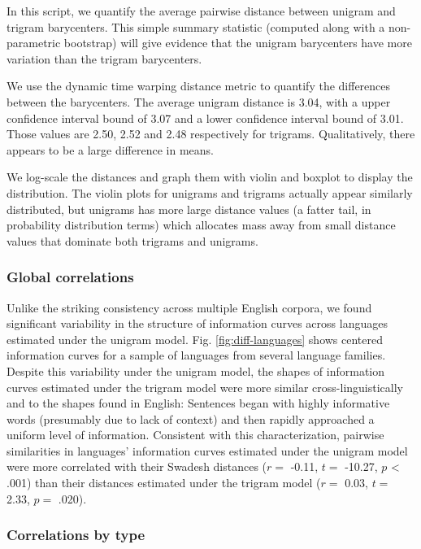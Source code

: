 \documentclass[man,floatsintext]{apa6}
\begin{document}
In this script, we quantify the average pairwise distance between unigram and trigram barycenters. This simple summary statistic (computed along with a non-parametric bootstrap) will give evidence that the unigram barycenters have more variation than the trigram barycenters.

We use the dynamic time warping distance metric to quantify the differences between the barycenters. The average unigram distance is 3.04, with a upper confidence interval bound of 3.07 and a lower confidence interval bound of 3.01. Those values are 2.50, 2.52 and 2.48 respectively for trigrams. Qualitatively, there appears to be a large difference in means.

We log-scale the distances and graph them with violin and boxplot to display the distribution. The violin plots for unigrams and trigrams actually appear similarly distributed, but unigrams has more large distance values (a fatter tail, in probability distribution terms) which allocates mass away from small distance values that dominate both trigrams and unigrams.

\hypertarget{global-correlations}{%
\subsubsection{Global correlations}\label{global-correlations}}

Unlike the striking consistency across multiple English corpora, we found significant variability in the structure of information curves across languages estimated under the unigram model. Fig. \ref{fig:diff-languages} shows centered information curves for a sample of languages from several language families. Despite this variability under the unigram model, the shapes of information curves estimated under the trigram model were more similar cross-linguistically and to the shapes found in English: Sentences began with highly informative words (presumably due to lack of context) and then rapidly approached a uniform level of information. Consistent with this characterization, pairwise similarities in languages' information curves estimated under the unigram model were more correlated with their Swadesh distances (\(r =\) -0.11, \(t =\) -10.27, \(p\) \textless{} .001) than their distances estimated under the trigram model (\(r =\) 0.03, \(t =\) 2.33, \(p =\) .020).

\hypertarget{correlations-by-type}{%
\subsubsection{Correlations by type}\label{correlations-by-type}}
\end{document}

